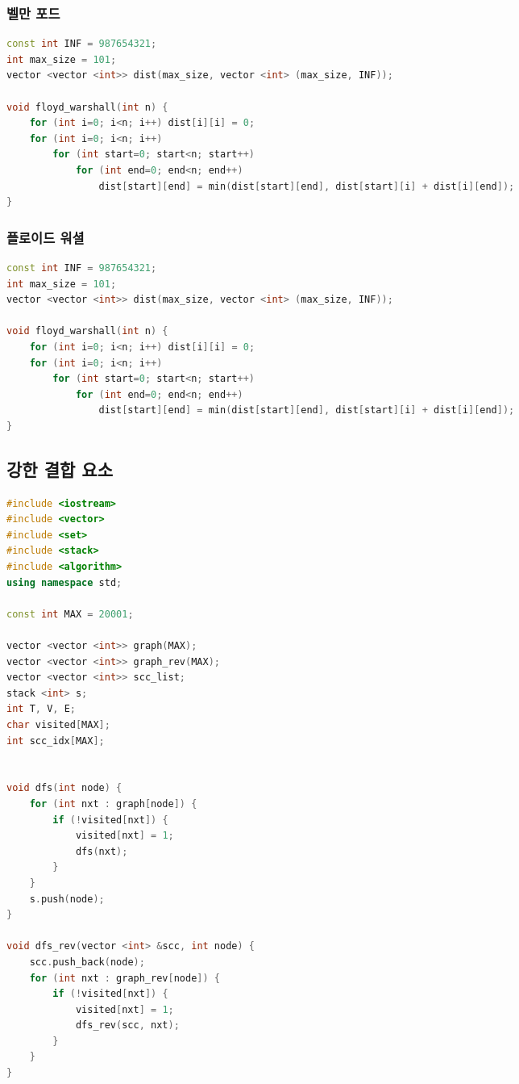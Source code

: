 \documentclass[]{article}
\begin{document}
\begin{multicols*}{2}
\subsubsection{벨만 포드}
\begin{lstlisting}[language=c++]
const int INF = 987654321;
int max_size = 101;
vector <vector <int>> dist(max_size, vector <int> (max_size, INF));

void floyd_warshall(int n) {
    for (int i=0; i<n; i++) dist[i][i] = 0;
    for (int i=0; i<n; i++)
        for (int start=0; start<n; start++)
            for (int end=0; end<n; end++)
                dist[start][end] = min(dist[start][end], dist[start][i] + dist[i][end]);
}
\end{lstlisting}
\columnbreak
\subsubsection{플로이드 워셜}
\begin{lstlisting}[language=c++]
const int INF = 987654321;
int max_size = 101;
vector <vector <int>> dist(max_size, vector <int> (max_size, INF));

void floyd_warshall(int n) {
    for (int i=0; i<n; i++) dist[i][i] = 0;
    for (int i=0; i<n; i++)
        for (int start=0; start<n; start++)
            for (int end=0; end<n; end++)
                dist[start][end] = min(dist[start][end], dist[start][i] + dist[i][end]);
}
\end{lstlisting}
\subsection{강한 결합 요소}
\begin{lstlisting}[language=c++]
#include <iostream>
#include <vector>
#include <set>
#include <stack>
#include <algorithm>
using namespace std;

const int MAX = 20001;

vector <vector <int>> graph(MAX);
vector <vector <int>> graph_rev(MAX);
vector <vector <int>> scc_list;
stack <int> s;
int T, V, E;
char visited[MAX];
int scc_idx[MAX];


void dfs(int node) {
    for (int nxt : graph[node]) {
        if (!visited[nxt]) {
            visited[nxt] = 1;
            dfs(nxt);
        }
    }
    s.push(node);
}

void dfs_rev(vector <int> &scc, int node) {
    scc.push_back(node);
    for (int nxt : graph_rev[node]) {
        if (!visited[nxt]) {
            visited[nxt] = 1;
            dfs_rev(scc, nxt);
        }
    }
}


\end{lstlisting}
\end{multicols*}
\end{document}
